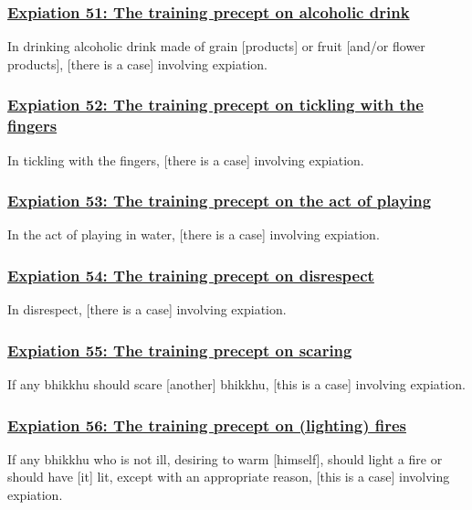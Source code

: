 \subsubsection*{\hyperref[pac51]{Expiation 51: The training precept on alcoholic drink}}
\label{exp51}
In drinking alcoholic drink made of grain [products] or fruit [and/or flower products], [there is a case] involving expiation.



\subsubsection*{\hyperref[pac52]{Expiation 52: The training precept on tickling with the fingers}}
\label{exp52}
In tickling with the fingers, [there is a case] involving expiation.



\subsubsection*{\hyperref[pac53]{Expiation 53: The training precept on the act of playing}}
\label{exp53}
In the act of playing in water, [there is a case] involving expiation.



\subsubsection*{\hyperref[pac54]{Expiation 54: The training precept on disrespect}}
\label{exp54}
In disrespect, [there is a case] involving expiation.



\subsubsection*{\hyperref[pac55]{Expiation 55: The training precept on scaring}}
\label{exp55}
If any bhikkhu should scare [another] bhikkhu, [this is a case] involving expiation.



\subsubsection*{\hyperref[pac56]{Expiation 56: The training precept on (lighting) fires}}
\label{exp56}
If any bhikkhu who is not ill, desiring to warm [himself], should light a fire or should have [it] lit, except with an appropriate reason, [this is a case] involving expiation.



